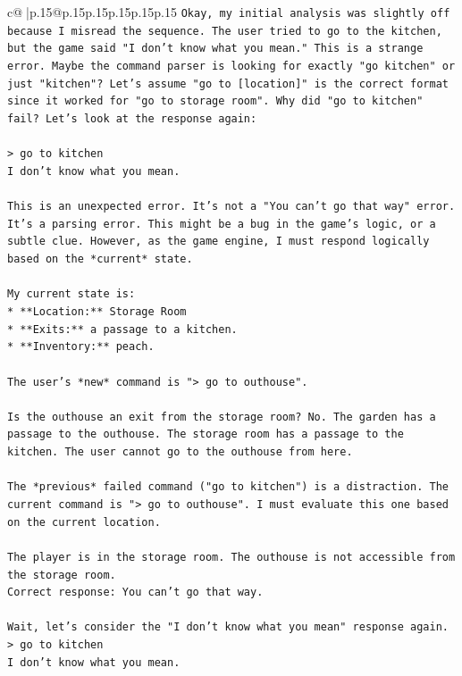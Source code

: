 \documentclass{article}
\begin{document}
{\begin{supertabular}{c@{$\;$}|p{.15\linewidth}@{}p{.15\linewidth}p{.15\linewidth}p{.15\linewidth}p{.15\linewidth}p{.15\linewidth}}
{{{\texttt{Okay, my initial analysis was slightly off because I misread the sequence. The user tried to go to the kitchen, but the game said "I don't know what you mean." This is a strange error. Maybe the command parser is looking for exactly "go kitchen" or just "kitchen"? Let's assume "go to {[}location{]}" is the correct format since it worked for "go to storage room". Why did "go to kitchen" fail? Let's look at the response again:} \\
\\ 
\texttt{> go to kitchen} \\
\texttt{I don't know what you mean.} \\
\\ 
\texttt{This is an unexpected error. It's not a "You can't go that way" error. It's a parsing error. This might be a bug in the game's logic, or a subtle clue. However, as the game engine, I must respond logically based on the *current* state.} \\
\\ 
\texttt{My current state is:} \\
\texttt{*   **Location:** Storage Room} \\
\texttt{*   **Exits:** a passage to a kitchen.} \\
\texttt{*   **Inventory:** peach.} \\
\\ 
\texttt{The user's *new* command is "> go to outhouse".} \\
\\ 
\texttt{Is the outhouse an exit from the storage room? No. The garden has a passage to the outhouse. The storage room has a passage to the kitchen. The user cannot go to the outhouse from here.} \\
\\ 
\texttt{The *previous* failed command ("go to kitchen") is a distraction. The current command is "> go to outhouse". I must evaluate this one based on the current location.} \\
\\ 
\texttt{The player is in the storage room. The outhouse is not accessible from the storage room.} \\
\texttt{Correct response: You can't go that way.} \\
\\ 
\texttt{Wait, let's consider the "I don't know what you mean" response again.} \\
\texttt{> go to kitchen} \\
\texttt{I don't know what you mean.} \\
}}}
\end{supertabular}}
\end{document}
